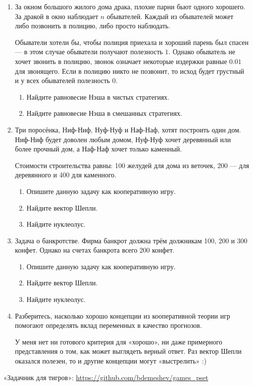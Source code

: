 \documentclass[12pt]{article} %
\theoremstyle{definition} %
\begin{document}
\begin{enumerate}
\item За окном большого жилого дома драка, плохие парни бьют одного хорошего. 
За дракой в окно наблюдает $n$ обывателей. 
Каждый из обывателей может либо позвонить в полицию, либо просто наблюдать. 

Обыватели хотели бы, чтобы полиция приехала и хороший парень был спасен — в этом случае обыватели получают полезность $1$. 
Однако обыватель не хочет звонить в полицию, звонок означает некоторые издержки равные $0.01$ для звонящего. 
Если в полицию никто не позвонит, то исход будет грустный и у всех обывателей полезность $0$. 

\begin{enumerate}
  \item Найдите равновесие Нэша в чистых стратегиях.
  \item Найдите равновесие Нэша в смешанных стратегиях.
\end{enumerate}


\newpage
\item Три поросёнка, Ниф-Ниф, Нуф-Нуф и Наф-Наф, хотят построить один дом. 
Ниф-Ниф будет доволен любым домом, 
Нуф-Нуф хочет деревянный или более прочный дом,
а Наф-Наф хочет только каменный. 

Стоимости строительства равны: 100 желудей для дома из веточек, 200 — для деревянного и 400 для каменного. 

\begin{enumerate}
  \item Опишите данную задачу как кооперативную игру. 
  \item Найдите вектор Шепли.
  \item Найдите нуклеолус. 
\end{enumerate}


\item Задача о банкротстве. Фирма банкрот должна трём должникам 100, 200 и 300 конфет. 
Однако на счетах банкрота всего 200 конфет. 

\begin{enumerate}
  \item Опишите данную задачу как кооперативную игру. 
  \item Найдите вектор Шепли.
  \item Найдите нуклеолус. 
\end{enumerate}


\item Разберитесь, насколько хорошо концепции из кооперативной теории игр 
помогают определять вклад переменных в качество прогнозов. 

У меня нет ни готового критерия для «хорошо», ни даже примерного представления о том, 
как может выглядеть верный ответ. Раз вектор Шепли оказался полезен, то и другие 
концепции могут «выстрелить» :)


\end{enumerate}


«Задачник для тигров»: \url{https://github.com/bdemeshev/games_pset}
\end{document}
